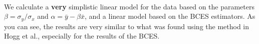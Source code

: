 \documentclass[11pt]{article}
\begin{document}
    \begin{center}
    \end{center}
    { \hspace*{\fill} \\}
    
    We calculate a \textbf{very} simplistic linear model for the data based
on the parameters \(\beta = \sigma_y / \sigma_x\) and
\(\alpha = \bar{y} - \beta\bar{x}\), and a linear model based on the
BCES estimators. As you can see, the results are very similar to what
was found using the method in Hogg et al., especially for the results of
the BCES.


    
    
    
    
\end{document}
